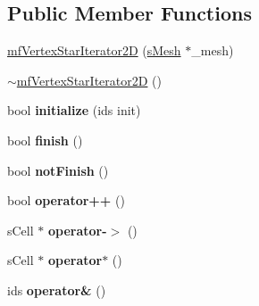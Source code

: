 \subsection*{Public Member Functions}
\begin{DoxyCompactItemize}
\item 
\hyperlink{classmf_1_1mfVertexStarIterator2D_ad0b86bd236b0a5e3bcd594c6f79e94c7}{mfVertexStarIterator2D} (\hyperlink{classmf_1_1mfIterator_aca31e4d7e7eca4e3b100530d8725064b}{sMesh} $\ast$\_\-mesh)
\item 
\hyperlink{classmf_1_1mfVertexStarIterator2D_a28c7d3235fd232a8881456a61bae6d02}{$\sim$mfVertexStarIterator2D} ()
\item 
\hypertarget{classmf_1_1mfVertexStarIterator2D_a4ad30c406b8449b415a1da3467438282}{
bool {\bfseries initialize} (ids init)}
\label{classmf_1_1mfVertexStarIterator2D_a4ad30c406b8449b415a1da3467438282}

\item 
\hypertarget{classmf_1_1mfVertexStarIterator2D_a38b904e0dcfcbdd0c349081f43621662}{
bool {\bfseries finish} ()}
\label{classmf_1_1mfVertexStarIterator2D_a38b904e0dcfcbdd0c349081f43621662}

\item 
\hypertarget{classmf_1_1mfVertexStarIterator2D_a387dd1cf9db316f8ef0034fc5e1a4c30}{
bool {\bfseries notFinish} ()}
\label{classmf_1_1mfVertexStarIterator2D_a387dd1cf9db316f8ef0034fc5e1a4c30}

\item 
\hypertarget{classmf_1_1mfVertexStarIterator2D_acaf33605c88155d3d843f454be9d7f2a}{
bool {\bfseries operator++} ()}
\label{classmf_1_1mfVertexStarIterator2D_acaf33605c88155d3d843f454be9d7f2a}

\item 
\hypertarget{classmf_1_1mfVertexStarIterator2D_aad1297b5024d1236666660419c8699d2}{
sCell $\ast$ {\bfseries operator-\/$>$} ()}
\label{classmf_1_1mfVertexStarIterator2D_aad1297b5024d1236666660419c8699d2}

\item 
\hypertarget{classmf_1_1mfVertexStarIterator2D_ab50b8139db709fd79e5aeb5f05253fc7}{
sCell $\ast$ {\bfseries operator$\ast$} ()}
\label{classmf_1_1mfVertexStarIterator2D_ab50b8139db709fd79e5aeb5f05253fc7}

\item 
\hypertarget{classmf_1_1mfVertexStarIterator2D_ab69d8b4494074c89685296fece780690}{
ids {\bfseries operator\&} ()}
\label{classmf_1_1mfVertexStarIterator2D_ab69d8b4494074c89685296fece780690}

\end{DoxyCompactItemize}
